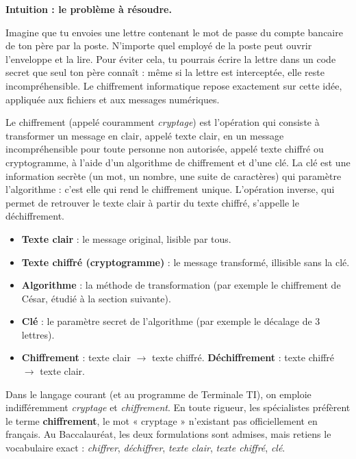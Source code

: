 \documentclass[11pt]{article}
\newcommand{\cle}[1]{{\popxbold\color{popdark}#1}}
\newcounter{popsec}
\newcounter{popsub}
\newcommand{\courssub}[1]{%
  \stepcounter{popsub}%
  \par\vspace{9pt}\noindent{\popxbold\fontsize{11.5}{13}\selectfont\color{popink}{\color{poporange}\thepopsec.\thepopsub}\hspace{6pt}#1}\par\nopagebreak\vspace{4pt}
}
\begin{document}
\courssub{Le chiffrement (cryptage)}

\textbf{Intuition : le problème à résoudre.}\par
Imagine que tu envoies une lettre contenant le mot de passe du compte bancaire de ton père par la poste. N'importe quel employé de la poste peut ouvrir l'enveloppe et la lire. Pour éviter cela, tu pourrais écrire la lettre dans un code secret que seul ton père connaît : même si la lettre est interceptée, elle reste incompréhensible. Le chiffrement informatique repose exactement sur cette idée, appliquée aux fichiers et aux messages numériques.

\begin{definition}
Le \cle{chiffrement} (appelé couramment \emph{cryptage}) est l'opération qui consiste à transformer un message en clair, appelé \cle{texte clair}, en un message incompréhensible pour toute personne non autorisée, appelé \cle{texte chiffré} ou \cle{cryptogramme}, à l'aide d'un \cle{algorithme de chiffrement} et d'une \cle{clé}.
La \cle{clé} est une information secrète (un mot, un nombre, une suite de caractères) qui paramètre l'algorithme : c'est elle qui rend le chiffrement unique. L'opération inverse, qui permet de retrouver le texte clair à partir du texte chiffré, s'appelle le \cle{déchiffrement}.
\end{definition}

\begin{propriete}
\begin{itemize}
  \item \textbf{Texte clair} : le message original, lisible par tous.
  \item \textbf{Texte chiffré (cryptogramme)} : le message transformé, illisible sans la clé.
  \item \textbf{Algorithme} : la méthode de transformation (par exemple le chiffrement de César, étudié à la section suivante).
  \item \textbf{Clé} : le paramètre secret de l'algorithme (par exemple le décalage de 3 lettres).
  \item \textbf{Chiffrement} : texte clair $\rightarrow$ texte chiffré. \textbf{Déchiffrement} : texte chiffré $\rightarrow$ texte clair.
\end{itemize}
\end{propriete}

\begin{attention}
Dans le langage courant (et au programme de Terminale TI), on emploie indifféremment \emph{cryptage} et \emph{chiffrement}. En toute rigueur, les spécialistes préfèrent le terme \textbf{chiffrement}, le mot « cryptage » n'existant pas officiellement en français. Au Baccalauréat, les deux formulations sont admises, mais retiens le vocabulaire exact : \emph{chiffrer}, \emph{déchiffrer}, \emph{texte clair}, \emph{texte chiffré}, \emph{clé}.
\end{attention}
\end{document}
